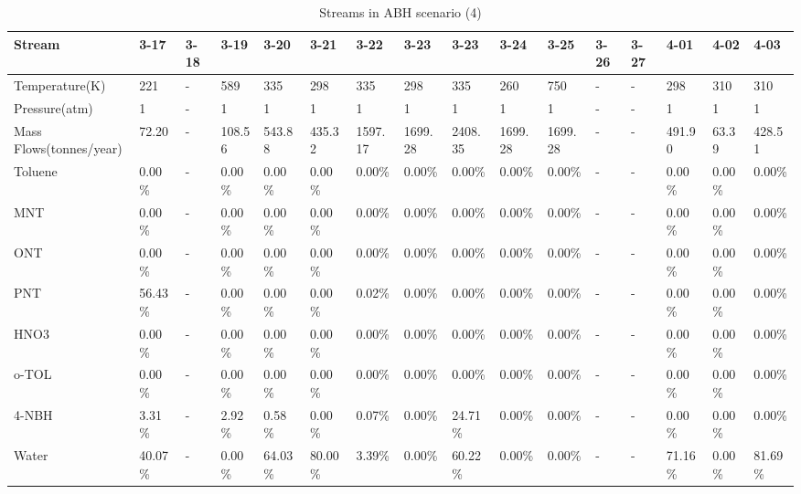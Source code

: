 \begin{landscape}
\begin{table}[H]
\centering
\caption{Streams in ABH scenario (4)}
\label{ABHFST4}
\begin{tabular}{|l|l|l|l|l|l|l|l|l|l|l|l|l|l|l|l|}
\hline
\textbf{Stream}         & 3-17    & 3-18 & 3-19    & 3-20    & 3-21    & 3-22    & 3-23    & 3-23    & 3-24    & 3-25    & 3-26 & 3-27 & 4-01    & 4-02     & 4-03    \\ \hline
Temperature(K)          & 221     & -    & 589     & 335     & 298     & 335     & 298     & 335     & 260     & 750     & -    & -    & 298     & 310      & 310     \\ \hline
Pressure(atm)           & 1       & -    & 1       & 1       & 1       & 1       & 1       & 1       & 1       & 1       & -    & -    & 1       & 1        & 1       \\ \hline
Mass Flows(tonnes/year) & 72.20   & -    & 108.56  & 543.88  & 435.32  & 1597.17 & 1699.28 & 2408.35 & 1699.28 & 1699.28 & -    & -    & 491.90  & 63.39    & 428.51  \\ \hline
Toluene                 & 0.00\%  & -    & 0.00\%  & 0.00\%  & 0.00\%  & 0.00\%  & 0.00\%  & 0.00\%  & 0.00\%  & 0.00\%  & -    & -    & 0.00\%  & 0.00\%   & 0.00\%  \\ \hline
MNT                     & 0.00\%  & -    & 0.00\%  & 0.00\%  & 0.00\%  & 0.00\%  & 0.00\%  & 0.00\%  & 0.00\%  & 0.00\%  & -    & -    & 0.00\%  & 0.00\%   & 0.00\%  \\ \hline
ONT                     & 0.00\%  & -    & 0.00\%  & 0.00\%  & 0.00\%  & 0.00\%  & 0.00\%  & 0.00\%  & 0.00\%  & 0.00\%  & -    & -    & 0.00\%  & 0.00\%   & 0.00\%  \\ \hline
PNT                     & 56.43\% & -    & 0.00\%  & 0.00\%  & 0.00\%  & 0.02\%  & 0.00\%  & 0.00\%  & 0.00\%  & 0.00\%  & -    & -    & 0.00\%  & 0.00\%   & 0.00\%  \\ \hline
HNO3                    & 0.00\%  & -    & 0.00\%  & 0.00\%  & 0.00\%  & 0.00\%  & 0.00\%  & 0.00\%  & 0.00\%  & 0.00\%  & -    & -    & 0.00\%  & 0.00\%   & 0.00\%  \\ \hline
o-TOL                   & 0.00\%  & -    & 0.00\%  & 0.00\%  & 0.00\%  & 0.00\%  & 0.00\%  & 0.00\%  & 0.00\%  & 0.00\%  & -    & -    & 0.00\%  & 0.00\%   & 0.00\%  \\ \hline
4-NBH                   & 3.31\%  & -    & 2.92\%  & 0.58\%  & 0.00\%  & 0.07\%  & 0.00\%  & 24.71\% & 0.00\%  & 0.00\%  & -    & -    & 0.00\%  & 0.00\%   & 0.00\%  \\ \hline
Water                   & 40.07\% & -    & 0.00\%  & 64.03\% & 80.00\% & 3.39\%  & 0.00\%  & 60.22\% & 0.00\%  & 0.00\%  & -    & -    & 71.16\% & 0.00\%   & 81.69\% \\ \hline

\end{tabular}
\end{table}
\end{landscape}
